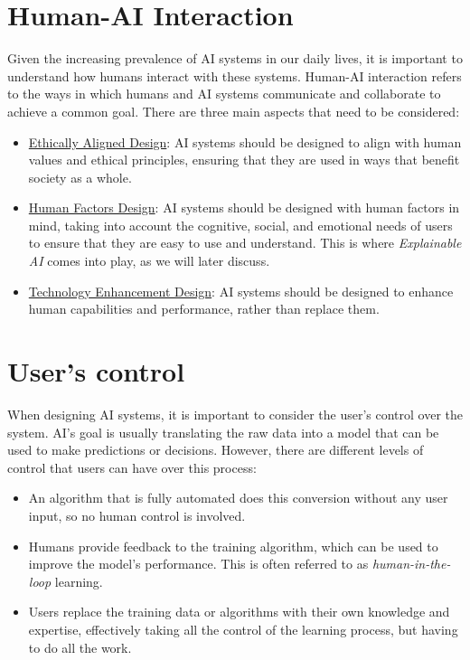 \section{Human-AI Interaction}

Given the increasing prevalence of AI systems in our daily lives, it is important to understand how humans interact with these systems. Human-AI interaction refers to the ways in which humans and AI systems communicate and collaborate to achieve a common goal. There are three main aspects that need to be considered:
\begin{itemize}
    \item \ul{Ethically Aligned Design}: AI systems should be designed to align with human values and ethical principles, ensuring that they are used in ways that benefit society as a whole.
    \item \ul{Human Factors Design}: AI systems should be designed with human factors in mind, taking into account the cognitive, social, and emotional needs of users to ensure that they are easy to use and understand. This is where \emph{Explainable AI} comes into play, as we will later discuss.
    \item \ul{Technology Enhancement Design}: AI systems should be designed to enhance human capabilities and performance, rather than replace them.
\end{itemize}

\section{User's control}

When designing AI systems, it is important to consider the user's control over the system. AI's goal is usually translating the raw data into a model that can be used to make predictions or decisions. However, there are different levels of control that users can have over this process:
\begin{itemize}
    \item An algorithm that is fully automated does this conversion without any user input, so no human control is involved.
    \item Humans provide feedback to the training algorithm, which can be used to improve the model's performance. This is often referred to as \emph{human-in-the-loop} learning.
    \item Users replace the training data or algorithms with their own knowledge and expertise, effectively taking all the control of the learning process, but having to do all the work.
\end{itemize}

